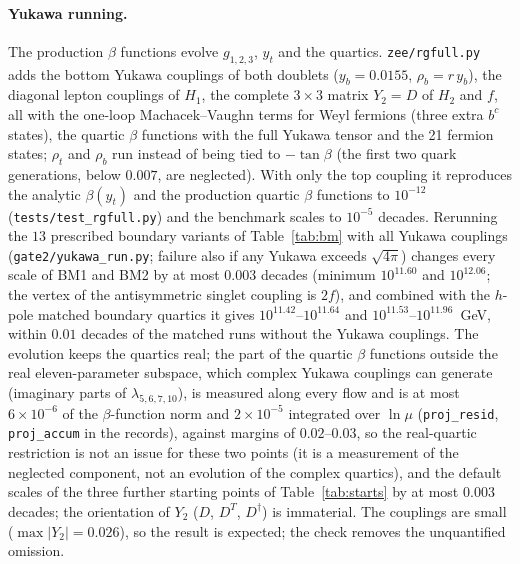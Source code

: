 \documentclass[twocolumn,epjc3]{svjour3}
\begin{document}
\paragraph{Yukawa running.} The production $\beta$ functions evolve $g_{1,2,3}$, $y_t$ and the quartics. \texttt{zee/rgfull.py} adds the bottom Yukawa couplings of both doublets ($y_b=0.0155$, $\rho_b=r\,y_b$), the diagonal lepton couplings of $H_1$, the complete $3\times3$ matrix $Y_2=D$ of $H_2$ and $f$, all with the one-loop Machacek--Vaughn terms for Weyl fermions (three extra $b^c$ states), the quartic $\beta$ functions with the full Yukawa tensor and the 21 fermion states; $\rho_t$ and $\rho_b$ run instead of being tied to $-\tan\beta$ (the first two quark generations, below $0.007$, are neglected). With only the top coupling it reproduces the analytic $\beta(y_t)$ and the production quartic $\beta$ functions to $10^{-12}$ (\texttt{tests/test\_rgfull.py}) and the benchmark scales to $10^{-5}$ decades. Rerunning the $13$ prescribed boundary variants of Table~\ref{tab:bm} with all Yukawa couplings (\texttt{gate2/yukawa\_run.py}; failure also if any Yukawa exceeds $\sqrt{4\pi}$) changes every scale of BM1 and BM2 by at most $0.003$ decades (minimum $10^{11.60}$ and $10^{12.06}$; the vertex of the antisymmetric singlet coupling is $2f$), and combined with the $h$-pole matched boundary quartics it gives $10^{11.42}$--$10^{11.64}$ and $10^{11.53}$--$10^{11.96}$~GeV, within $0.01$ decades of the matched runs without the Yukawa couplings. The evolution keeps the quartics real; the part of the quartic $\beta$ functions outside the real eleven-parameter subspace, which complex Yukawa couplings can generate (imaginary parts of $\lambda_{5,6,7,10}$), is measured along every flow and is at most $6\times10^{-6}$ of the $\beta$-function norm and $2\times10^{-5}$ integrated over $\ln\mu$ (\texttt{proj\_resid}, \texttt{proj\_accum} in the records), against margins of $0.02$--$0.03$, so the real-quartic restriction is not an issue for these two points (it is a measurement of the neglected component, not an evolution of the complex quartics), and the default scales of the three further starting points of Table~\ref{tab:starts} by at most $0.003$ decades; the orientation of $Y_2$ ($D$, $D^T$, $D^\dagger$) is immaterial. The couplings are small ($\max|Y_2|=0.026$), so the result is expected; the check removes the unquantified omission.
\end{document}
